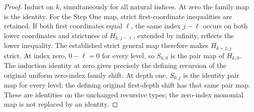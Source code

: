 \begin{proof}
Induct on $k$, simultaneously for all natural indices. At zero the family
map is the identity. For the Step One map, strict first-coordinate
inequalities are retained. If both first coordinates equal $\ell$, the
same index $j-\ell$ occurs on both lower coordinates and strictness of
$H_{k,j-\ell}$, extended by infinity, reflects the lower inequality.
The established strict general map therefore makes $H_{k+1,j}$ strict.
At index zero, $0-\ell=0$ for every level, so $S_{k,0}$ is the pair map
of $H_{k,0}$. The induction identity at zero gives precisely the defining
recursion of the original uniform zero-index family shift. At depth one,
$S_{0,j}$ is the identity pair map for every level; the defining original
first-depth shift has that same pair map. These are identities on the
unchanged recursive types; the zero-index monomial map is not replaced
by an identity.
\end{proof}

